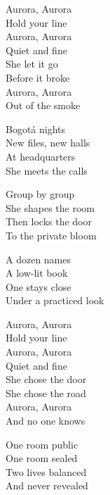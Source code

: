\begin{lyrics}
Aurora, Aurora\\
Hold your line\\
Aurora, Aurora\\
Quiet and fine\\
She let it go\\
Before it broke\\
Aurora, Aurora\\
Out of the smoke

Bogotá nights\\
New files, new halls\\
At headquarters\\
She meets the calls

Group by group\\
She shapes the room\\
Then locks the door\\
To the private bloom

A dozen names\\
A low-lit book\\
One stays close\\
Under a practiced look

Aurora, Aurora\\
Hold your line\\
Aurora, Aurora\\
Quiet and fine\\
She chose the door\\
She chose the road\\
Aurora, Aurora\\
And no one knows

One room public\\
One room sealed\\
Two lives balanced\\
And never revealed
\end{lyrics}

